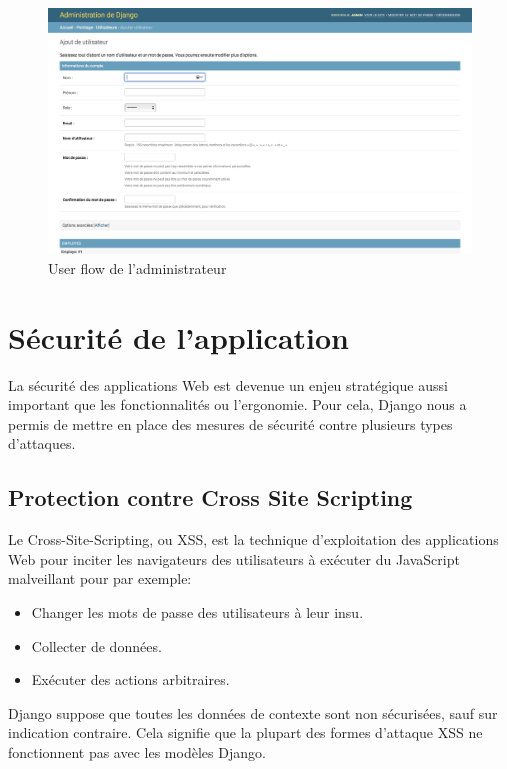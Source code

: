 \begin{figure}[h!]
    \centering
    \includegraphics[scale=0.35]{images/interface/admin_add_employe.png}
    \vspace{-20pt}
    \caption{User flow de l'administrateur}
    \label{fig101}
\end{figure}

\section{Sécurité de l’application}
La sécurité des applications Web est devenue un enjeu stratégique aussi
important que les fonctionnalités ou l’ergonomie. Pour cela, Django nous a
permis de mettre en place des mesures de sécurité contre plusieurs types
d’attaques.

\subsection{Protection contre Cross Site Scripting}
Le Cross-Site-Scripting, ou XSS, est la technique d'exploitation des 
applications Web pour inciter les navigateurs des utilisateurs à exécuter du 
JavaScript malveillant pour par exemple:

\begin{itemize}
    \item[\textbullet] Changer les mots de passe des utilisateurs à leur insu.
    \item[\textbullet] Collecter de données.
    \item[\textbullet] Exécuter des actions arbitraires.
\end{itemize}

Django suppose que toutes les données de contexte sont non sécurisées, sauf sur 
indication contraire. Cela signifie que la plupart des formes d'attaque XSS ne 
fonctionnent pas avec les modèles Django.

